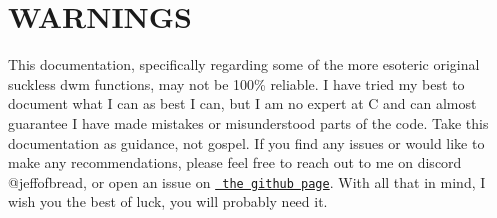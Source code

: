 \chapter{WARNINGS}
\hypertarget{index}{}\label{index}
\label{index_md_dwm_2docs_2mainpage}%
%
 This documentation, specifically regarding some of the more esoteric original suckless dwm functions, may not be 100\% reliable. I have tried my best to document what I can as best I can, but I am no expert at C and can almost guarantee I have made mistakes or misunderstood parts of the code. Take this documentation as guidance, not gospel. If you find any issues or would like to make any recommendations, please feel free to reach out to me on discord @jeffofbread, or open an issue on \href{https://github.com/JeffofBread/jdwm}{\texttt{ the github page}}. With all that in mind, I wish you the best of luck, you will probably need it. 
